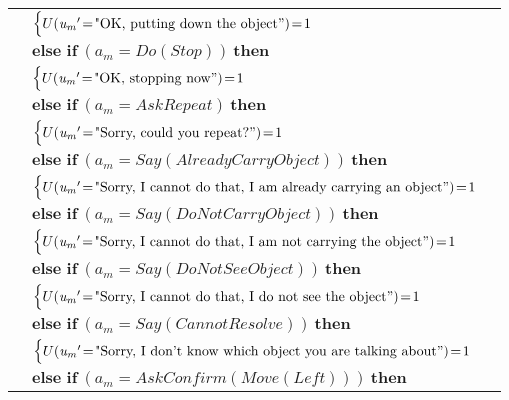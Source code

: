 \begin{footnotesize}
\begin{longtable}{p{2cm}l}
& \;\;\;\;\; $ \begin{cases}U(\mathit{u_m}'\!=\!\text{"OK, putting down the object}")\!=\!1 \end{cases}$ \vspace{1mm} \\ & $ \textbf{else if} \ (\mathit{a_m}\!=\!\mathit{Do(Stop)}) \ \textbf{then}$ \\
& \;\;\;\;\; $ \begin{cases}U(\mathit{u_m}'\!=\!\text{"OK, stopping now}")\!=\!1 \end{cases}$ \vspace{1mm} \\ & $ \textbf{else if} \ (\mathit{a_m}\!=\!\mathit{AskRepeat}) \ \textbf{then}$ \\
& \;\;\;\;\; $ \begin{cases}U(\mathit{u_m}'\!=\!\text{"Sorry, could you repeat?}")\!=\!1 \end{cases}$ \vspace{1mm} \\ & $ \textbf{else if} \ (\mathit{a_m}\!=\!\mathit{Say(AlreadyCarryObject)}) \ \textbf{then}$ \\
& \;\;\;\;\; $ \begin{cases}U(\mathit{u_m}'\!=\!\text{"Sorry, I cannot do that, I am already carrying an object}")\!=\!1 \end{cases}$ \vspace{1mm} \\ & $ \textbf{else if} \ (\mathit{a_m}\!=\!\mathit{Say(DoNotCarryObject)}) \ \textbf{then}$ \\
& \;\;\;\;\; $ \begin{cases}U(\mathit{u_m}'\!=\!\text{"Sorry, I cannot do that, I am not carrying the object}")\!=\!1 \end{cases}$ \vspace{1mm} \\ & $ \textbf{else if} \ (\mathit{a_m}\!=\!\mathit{Say(DoNotSeeObject)}) \ \textbf{then}$ \\
& \;\;\;\;\; $ \begin{cases}U(\mathit{u_m}'\!=\!\text{"Sorry, I cannot do that, I do not see the object}")\!=\!1 \end{cases}$ \vspace{1mm} \\ & $ \textbf{else if} \ (\mathit{a_m}\!=\!\mathit{Say(CannotResolve)}) \ \textbf{then}$ \\
& \;\;\;\;\; $ \begin{cases}U(\mathit{u_m}'\!=\!\text{"Sorry, I don't know which object you are talking about}")\!=\!1 \end{cases}$ \vspace{1mm} \\ & $ \textbf{else if} \ (\mathit{a_m}\!=\!\mathit{AskConfirm(Move(Left))}) \ \textbf{then}$ \\

\end{longtable}
\end{footnotesize}
